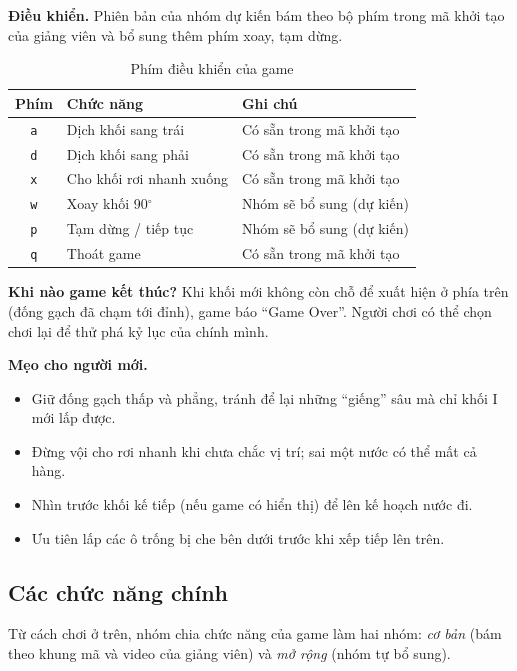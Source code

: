 \documentclass[13pt,a4paper]{extarticle}
\begin{document}
\textbf{Điều khiển.} Phiên bản của nhóm dự kiến bám theo bộ phím trong mã khởi tạo của giảng viên và bổ sung thêm phím xoay, tạm dừng.

\begin{table}[H]
\centering
\begin{tabularx}{\linewidth}{@{}c X X@{}}
\toprule
\textbf{Phím} & \textbf{Chức năng} & \textbf{Ghi chú}\\
\midrule
\texttt{a} & Dịch khối sang trái & Có sẵn trong mã khởi tạo\\
\texttt{d} & Dịch khối sang phải & Có sẵn trong mã khởi tạo\\
\texttt{x} & Cho khối rơi nhanh xuống & Có sẵn trong mã khởi tạo\\
\texttt{w} & Xoay khối 90$^\circ$ & Nhóm sẽ bổ sung (dự kiến)\\
\texttt{p} & Tạm dừng / tiếp tục & Nhóm sẽ bổ sung (dự kiến)\\
\texttt{q} & Thoát game & Có sẵn trong mã khởi tạo\\
\bottomrule
\end{tabularx}
\caption{Phím điều khiển của game}
\end{table}

\textbf{Khi nào game kết thúc?} Khi khối mới không còn chỗ để xuất hiện ở phía trên (đống gạch đã chạm tới đỉnh), game báo ``Game Over''. Người chơi có thể chọn chơi lại để thử phá kỷ lục của chính mình.

\textbf{Mẹo cho người mới.}
\begin{itemize}
  \item Giữ đống gạch thấp và phẳng, tránh để lại những ``giếng'' sâu mà chỉ khối I mới lấp được.
  \item Đừng vội cho rơi nhanh khi chưa chắc vị trí; sai một nước có thể mất cả hàng.
  \item Nhìn trước khối kế tiếp (nếu game có hiển thị) để lên kế hoạch nước đi.
  \item Ưu tiên lấp các ô trống bị che bên dưới trước khi xếp tiếp lên trên.
\end{itemize}

\subsection{Các chức năng chính}\label{sec:chucnang}
Từ cách chơi ở trên, nhóm chia chức năng của game làm hai nhóm: \emph{cơ bản} (bám theo khung mã và video của giảng viên) và \emph{mở rộng} (nhóm tự bổ sung).
\end{document}
